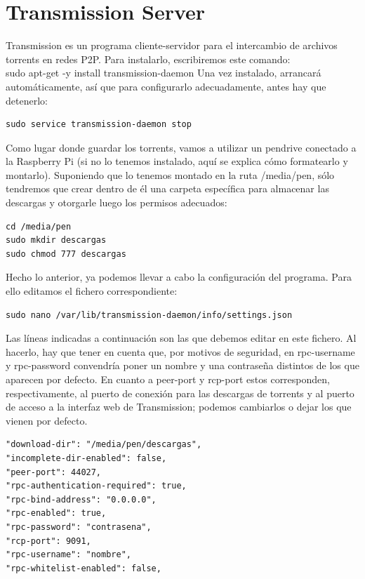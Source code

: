 \documentclass{article}
\begin{document}
\section{Transmission Server}
Transmission es un programa cliente-servidor para el intercambio de archivos torrents en redes P2P. Para instalarlo, escribiremos este comando:\\

sudo apt-get -y install transmission-daemon
Una vez instalado, arrancará automáticamente, así que para configurarlo adecuadamente, antes hay que detenerlo:\\

\begin{verbatim}
sudo service transmission-daemon stop    
\end{verbatim}

Como lugar donde guardar los torrents, vamos a utilizar un pendrive conectado a la Raspberry Pi (si no lo tenemos instalado, aquí se explica cómo formatearlo y montarlo). Suponiendo que lo tenemos montado en la ruta /media/pen, sólo tendremos que crear dentro de él una carpeta específica para almacenar las descargas y otorgarle luego los permisos adecuados:

\begin{verbatim}
cd /media/pen 
sudo mkdir descargas 
sudo chmod 777 descargas
\end{verbatim}

Hecho lo anterior, ya podemos llevar a cabo la configuración del programa. Para ello editamos el fichero correspondiente:\\

\begin{verbatim}
sudo nano /var/lib/transmission-daemon/info/settings.json
\end{verbatim}

Las líneas indicadas a continuación son las que debemos editar en este fichero. Al hacerlo, hay que tener en cuenta que, por motivos de seguridad, en rpc-username y rpc-password convendría poner un nombre y una contraseña distintos de los que aparecen por defecto. En cuanto a peer-port y rcp-port estos corresponden, respectivamente, al puerto de conexión para las descargas de torrents	y al puerto de acceso a la interfaz web de Transmission; podemos cambiarlos	o dejar los que vienen por defecto.\\

\begin{verbatim}
"download-dir": "/media/pen/descargas", 
"incomplete-dir-enabled": false, 
"peer-port": 44027, 
"rpc-authentication-required": true, 
"rpc-bind-address": "0.0.0.0", 
"rpc-enabled": true, 
"rpc-password": "contrasena", 
"rcp-port": 9091, 
"rpc-username": "nombre", 
"rpc-whitelist-enabled": false,
\end{verbatim}
\end{document}
